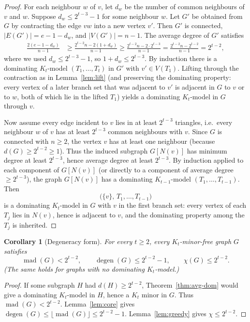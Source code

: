\documentclass[11pt]{article}
\newtheorem{corollary}[theorem]{Corollary}
\theoremstyle{definition}
\newcommand{\degen}{\operatorname{degen}}
\newcommand{\mad}{\operatorname{mad}}
\begin{document}
\begin{proof}
For each neighbour \(w\) of \(v\), let \(d_w\) be the number of common neighbours
of \(v\) and \(w\). Suppose \(d_w\le 2^{t-3}-1\) for some neighbour \(w\). Let
\(G'\) be obtained from \(G\) by contracting the edge \(vw\) into a new vertex
\(v'\). Then \(G'\) is connected,
\(|E(G')|=e-1-d_w\), and \(|V(G')|=n-1\). The average degree of \(G'\) satisfies
\begin{align*}
\frac{2(e-1-d_w)}{n-1}
&\ge\frac{2^{t-2}n-2(1+d_w)}{n-1}
\ge\frac{2^{t-2}n-2\cdot 2^{t-3}}{n-1}
=\frac{2^{t-2}n-2^{t-2}}{n-1}
=2^{t-2},
\end{align*}
where we used \(d_w\le 2^{t-3}-1\), so \(1+d_w\le 2^{t-3}\). By induction there is
a dominating \(K_t\)-model \((T_1,\dots,T_t)\) in \(G'\) with \(v'\in V(T_1)\).
Lifting through the contraction as in Lemma~\ref{lem:lift} (and preserving the
dominating property: every vertex of a later branch set that was adjacent to
\(v'\) is adjacent in \(G\) to \(v\) or to \(w\), both of which lie in the lifted
\(T_1\)) yields a dominating \(K_t\)-model in \(G\) through \(v\).

Now assume every edge incident to \(v\) lies in at least \(2^{t-3}\) triangles,
i.e.\ every neighbour \(w\) of \(v\) has at least \(2^{t-3}\) common neighbours
with \(v\). Since \(G\) is connected with \(n\ge 2\), the vertex \(v\) has at
least one neighbour (because \(d(G)\ge 2^{t-2}\ge 1\)). Thus the induced subgraph
\(G[N(v)]\) has minimum degree at least \(2^{t-3}\), hence average degree at
least \(2^{t-3}\). By induction applied to each component of \(G[N(v)]\) (or
directly to a component of average degree \(\ge 2^{t-3}\)), the graph
\(G[N(v)]\) has a dominating \(K_{t-1}\)-model \((T_1,\dots,T_{t-1})\). Then
\[
\bigl(\{v\},\,T_1,\dots,T_{t-1}\bigr)
\]
is a dominating \(K_t\)-model in \(G\) with \(v\) in the first branch set: every
vertex of each \(T_j\) lies in \(N(v)\), hence is adjacent to \(v\), and the
dominating property among the \(T_j\) is inherited.
\end{proof}

\begin{corollary}[Degeneracy form]\label{cor:degen-exp}
For every \(t\ge 2\), every \(K_t\)-minor-free graph \(G\) satisfies
\[
\mad(G)<2^{t-2},\qquad
\degen(G)\le 2^{t-2}-1,\qquad
\chi(G)\le 2^{t-2}.
\]
(The same holds for graphs with no dominating \(K_t\)-model.)
\end{corollary}

\begin{proof}
If some subgraph \(H\) had \(d(H)\ge 2^{t-2}\), Theorem~\ref{thm:avg-dom} would
give a dominating \(K_t\)-model in \(H\), hence a \(K_t\) minor in \(G\). Thus
\(\mad(G)<2^{t-2}\). Lemma~\ref{lem:core} gives
\(\degen(G)\le\lfloor\mad(G)\rfloor\le 2^{t-2}-1\). Lemma~\ref{lem:greedy} gives
\(\chi\le 2^{t-2}\).
\end{proof}
\end{document}

